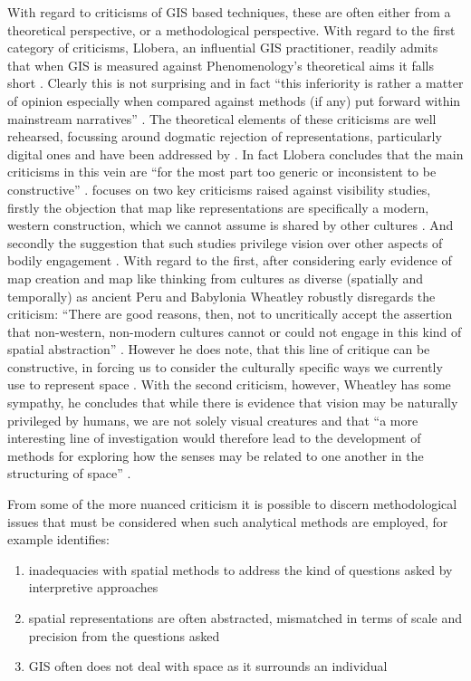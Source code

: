 With regard to criticisms of GIS based techniques, these are often either from a theoretical perspective, or a methodological perspective. With regard to the first category of criticisms, Llobera, an influential GIS practitioner, readily admits that when GIS is measured against Phenomenology's theoretical aims it falls short \citep[497]{Llobera2012}. Clearly this is not surprising and in fact ``this inferiority is rather a matter of opinion especially when compared against methods (if any) put forward within mainstream narratives'' \citep[498]{Llobera2012}. The theoretical elements of these criticisms are well rehearsed, focussing around dogmatic rejection of representations, particularly digital ones and have been addressed by \citet[498]{Llobera2012}. In fact Llobera concludes that the main criticisms in this vein are ``for the most part too generic or inconsistent to be constructive'' \citep[499]{Llobera2012}. \citet{eps364158} focuses on two key criticisms raised against visibility studies, firstly the objection that map like representations are specifically a modern, western construction, which we cannot assume is shared by other cultures \citep[118]{eps364158}. And secondly the suggestion that such studies privilege vision over other aspects of bodily engagement \citep[118]{eps364158}. With regard to the first, after considering early evidence of map creation and map like thinking from cultures as diverse (spatially and temporally) as ancient Peru and Babylonia Wheatley robustly disregards the criticism: ``There are good reasons, then, not to uncritically accept the assertion that non-western, non-modern cultures cannot or could not engage in this kind of spatial abstraction'' \citep[119]{eps364158}. However he does note, that this line of critique can be constructive, in forcing us to consider the culturally specific ways we currently use to represent space \citep[118]{eps364158}. With the second criticism, however,  Wheatley has some sympathy, he concludes that while there is evidence that vision may be naturally privileged by humans, we are not solely visual creatures \citep[121]{eps364158} and that ``a more interesting line of investigation would therefore lead to the development of methods for exploring how the senses may be related to one another in the structuring of space'' \citep[121]{eps364158}.

From some of the more nuanced criticism it is possible to discern methodological issues that must be considered when such analytical methods are employed, for example \citet{Llobera2012} identifies:
\begin{enumerate}
\item inadequacies with spatial methods to address the kind of questions asked by interpretive approaches
\item spatial representations are often abstracted, mismatched in terms of scale and precision from the questions asked
\item GIS often does not deal with space as it surrounds an individual
\end{enumerate}

